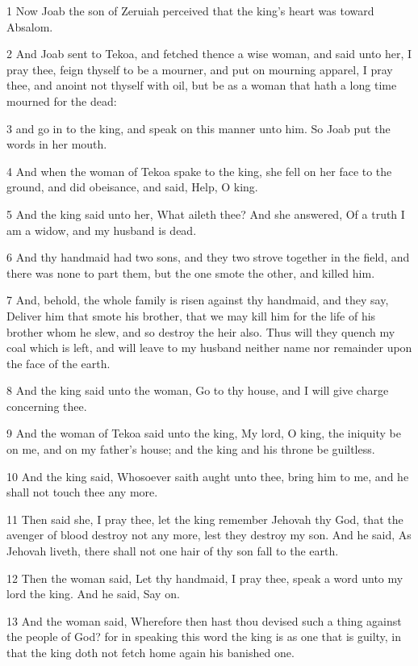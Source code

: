 \par 1 Now Joab the son of Zeruiah perceived that the king's heart was toward Absalom.
\par 2 And Joab sent to Tekoa, and fetched thence a wise woman, and said unto her, I pray thee, feign thyself to be a mourner, and put on mourning apparel, I pray thee, and anoint not thyself with oil, but be as a woman that hath a long time mourned for the dead:
\par 3 and go in to the king, and speak on this manner unto him. So Joab put the words in her mouth.
\par 4 And when the woman of Tekoa spake to the king, she fell on her face to the ground, and did obeisance, and said, Help, O king.
\par 5 And the king said unto her, What aileth thee? And she answered, Of a truth I am a widow, and my husband is dead.
\par 6 And thy handmaid had two sons, and they two strove together in the field, and there was none to part them, but the one smote the other, and killed him.
\par 7 And, behold, the whole family is risen against thy handmaid, and they say, Deliver him that smote his brother, that we may kill him for the life of his brother whom he slew, and so destroy the heir also. Thus will they quench my coal which is left, and will leave to my husband neither name nor remainder upon the face of the earth.
\par 8 And the king said unto the woman, Go to thy house, and I will give charge concerning thee.
\par 9 And the woman of Tekoa said unto the king, My lord, O king, the iniquity be on me, and on my father's house; and the king and his throne be guiltless.
\par 10 And the king said, Whosoever saith aught unto thee, bring him to me, and he shall not touch thee any more.
\par 11 Then said she, I pray thee, let the king remember Jehovah thy God, that the avenger of blood destroy not any more, lest they destroy my son. And he said, As Jehovah liveth, there shall not one hair of thy son fall to the earth.
\par 12 Then the woman said, Let thy handmaid, I pray thee, speak a word unto my lord the king. And he said, Say on.
\par 13 And the woman said, Wherefore then hast thou devised such a thing against the people of God? for in speaking this word the king is as one that is guilty, in that the king doth not fetch home again his banished one.
